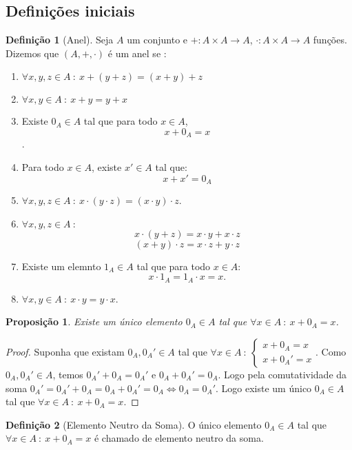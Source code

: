 \documentclass{article}
\theoremstyle{plain}
\newtheorem{prop}{Proposição}[section]
\theoremstyle{definition}
\newtheorem{definicao}{Definição}[section]
\theoremstyle{remark}
\begin{document}
\subsection{Definições iniciais}
\begin{definicao}[Anel]
	Seja $A$ um conjunto e $+ : A\times A \to A$, $\cdot : A \times A \to A$ funções. Dizemos que $(A, +, \cdot) $ é um anel se :
	\begin{enumerate}
		\item  $ \forall x,y,z\in A \: : \:  x+ (y+z) = (x+y) + z $
		\item $ \forall x,y \in A \: : \:  x+ y = y+x $
		\item Existe $0_A \in A$ tal que para todo $x\in A$, $$x+0_A = x$$.
		\item Para todo $x\in A$, existe $x'\in A$ tal que:  $$ x + x' = 0_A$$
		\item  $ \forall x,y,z\in A \: : \:  x\cdot (y\cdot z) = (x\cdot y)\cdot z$.
		\item  $ \forall x,y,z\in A \: :$
			$$x\cdot (y+ z) = x\cdot y + x\cdot z$$
			$$ (x+ y) \cdot z = x\cdot z + y\cdot z$$
		\item  Existe um elemnto $1_A \in A$ tal que para todo $x\in A$: $$ x\cdot 1_A = 1_A\cdot x =  x.$$
		\item  $ \forall x,y\in A \: : \:  x\cdot y = y\cdot x$.
	\end{enumerate}
\end{definicao}

\begin{prop}
	Existe um único elemento $0_A\in A$ tal que $ \forall x\in A \: : \: x+0_A = x$.
\end{prop}
\begin{proof}
	Suponha que existam $0_A, 0_A'\in A$ tal que $\forall x\in A \: : \:  \begin{cases} x+0_A = x \\ x+0_A' = x\end{cases}$. Como $0_A,0_A' \in A$, temos $0_A'+ 0_A = 0_A'$ e $0_A + 0_A' = 0_A$. Logo pela comutatividade da soma $0_A' = 0_A' + 0_A = 0_A +0_A' = 0_A \iff 0_A = 0_A'$.  
		Logo existe um único $0_A\in A$ tal que $\forall x\in A \: : \: x+0_A = x$.
\end{proof}
\begin{definicao}[Elemento Neutro da Soma]
	O único elemento $0_A\in A$ tal que $\forall x\in A \: : \: x+0_A  = x$ é chamado de elemento neutro da soma.
\end{definicao}
\end{document}
